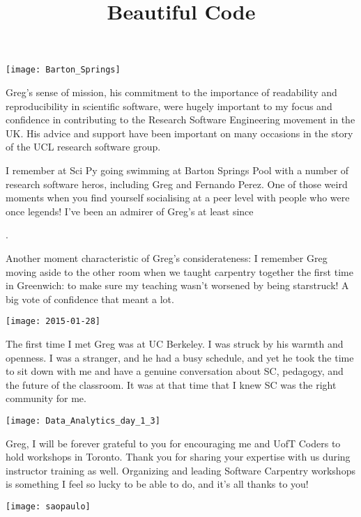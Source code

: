 \texttt{[image: Barton\_Springs]}

Greg's sense of mission, his commitment to the importance of readability and
reproducibility in scientific software, were hugely important to my focus and
confidence in contributing to the Research Software Engineering movement in the
UK. His advice and support have been important on many occasions in the story
of the UCL research software group.

I remember at Sci Py going swimming at Barton Springs Pool with a number of
research software heros, including Greg and Fernando Perez. One of those weird
moments when you find yourself socialising at a peer level with people who were
once legends! I've been an admirer of Greg's at least since \title{Beautiful
Code}.

Another moment characteristic of Greg's considerateness: I remember Greg moving
aside to the other room when we taught carpentry together the first time in
Greenwich: to make sure my teaching wasn't worsened by being starstruck! A big
vote of confidence that meant a lot.

\vspace*{\fill}

\newpage
\texttt{[image: 2015-01-28]}

The first time I met Greg was at UC Berkeley. I was struck by his warmth and
openness. I was a stranger, and he had a busy schedule, and yet he took the
time to sit down with me and have a genuine conversation about SC, pedagogy,
and the future of the classroom. It was at that time that I knew SC was the
right community for me.


\newpage
\vspace*{\fill}

\texttt{[image: Data\_Analytics\_day\_1\_3]}

Greg, I will be forever grateful to you for encouraging me and UofT Coders to
hold workshops in Toronto. Thank you for sharing your expertise with us during
instructor training as well. Organizing and leading Software Carpentry
workshops is something I feel so lucky to be able to do, and it's all thanks to
you!

\vspace*{\fill}

\newpage
\texttt{[image: saopaulo]}

